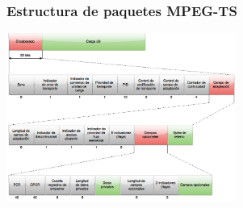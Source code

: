 \documentclass[a4paper,11pt]{beamer}
\begin{document}
					

			\begin{frame}
				\frametitle{Estructura de paquetes MPEG-TS}
				\begin{center}
					\includegraphics[width=7.5cm]{appendix_ts_packet_detail.png}
				\end{center}
			\end{frame}
\end{document}
